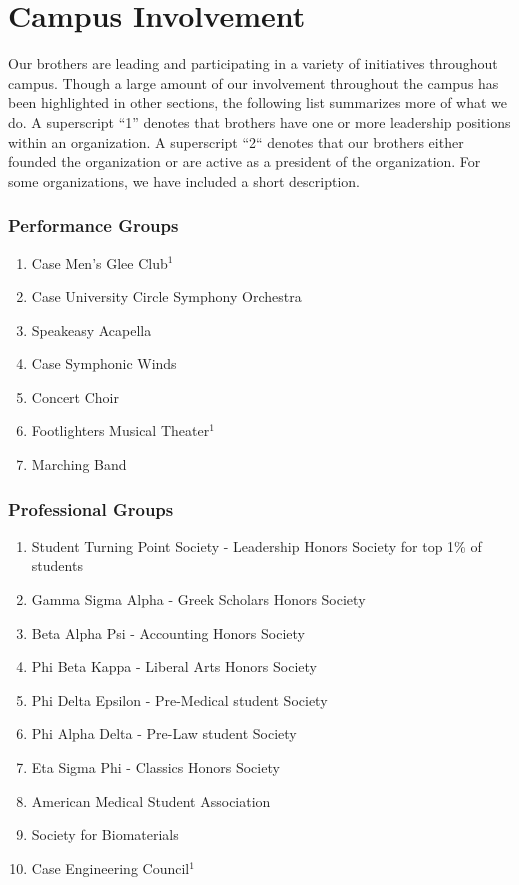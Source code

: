 \chapter{Campus Involvement}

  Our brothers are leading and participating in a variety of initiatives throughout campus. Though a large amount of our involvement throughout the campus has been highlighted in other sections, the following list summarizes more of what we do. A superscript ``1'' denotes that brothers have one or more leadership positions within an organization. A superscript ``2`` denotes that our brothers either founded the organization or are active as a president of the organization. For some organizations, we have included a short description.
    
    \subsection*{Performance Groups}
      \begin{enumerate}
      	\item Case Men's Glee Club$^1$
      	\item Case University Circle Symphony Orchestra
		\item Speakeasy Acapella
		\item Case Symphonic Winds
      	\item Concert Choir
      	\item Footlighters Musical Theater$^1$
      	\item Marching Band
      \end{enumerate}
      
    \subsection*{Professional Groups}
      \begin{enumerate}
      	\item Student Turning Point Society - Leadership Honors Society for top 1\% of students
      	\item Gamma Sigma Alpha - Greek Scholars Honors Society
      	\item Beta Alpha Psi - Accounting Honors Society
      	\item Phi Beta Kappa - Liberal Arts Honors Society
      	\item Phi Delta Epsilon - Pre-Medical student Society
      	\item Phi Alpha Delta - Pre-Law student Society
      	\item Eta Sigma Phi - Classics Honors Society
      	\item American Medical Student Association
      	\item Society for Biomaterials
		\item Case Engineering Council$^1$
      \end{enumerate}
      
